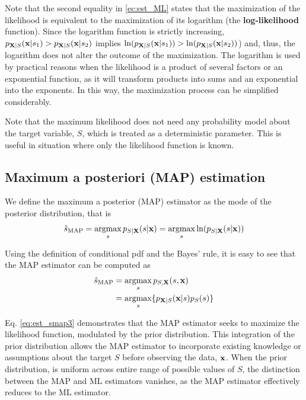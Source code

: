 {Note that the second equality in \eqref{ec:est_ML} states that the maximization of the likelihood is equivalent to the maximization of its logarithm (the \textbf{log-likelihood} function). Since the logarithm function is strictly increasing, $p_{{\bf X}|S}({\bf x}|s_1) > p_{{\bf X}|S}({\bf x}|s_2)$ implies $\ln(p_{{\bf X}|S}({\bf x}|s_1)) > \ln(p_{{\bf X}|S}({\bf x}|s_2))$) and, thus, the logarithm does not alter the outcome of the maximization}. The logarithm is used by practical reasons when the likelihood is a product of several factors or an exponential function, as it will transform products into sums and an exponential into the exponents. In this way, the maximization process can be simplified considerably.

{Note that the maximum likelihood does not need any probability model about the target variable, $S$, which is treated as a deterministic parameter. This is useful in situation where only the likelihood function is known}.


\subsection{Maximum a posteriori (MAP) estimation}

We define the maximum a posterior (MAP) estimator as the mode of the posterior distribution, that is
\begin{equation}
\hat s_{\text{MAP}} = \operatorname*{argmax}_{s} p_{{S|\bf X}}(s|{\bf x})
                    = \operatorname*{argmax}_{s} \ln(p_{{S|\bf X}}(s|{\bf x}))
                   \label{ec:est_MAP}
\end{equation}

{Using the definition of conditional pdf and the Bayes' rule, it is easy to see that the MAP estimator can be computed as
\begin{align}
\label{eq:est_smap2}
\hat s_{\text{MAP}} 
	&= \operatorname*{argmax}_{s} p_{{S,\bf X}}(s,{\bf x})   \\
\label{eq:est_smap3}
    &= \operatorname*{argmax}_{s} \{p_{{\bf X}|S}({\bf x}|s) p_S(s)\}
\end{align}}

{Eq. \eqref{eq:est_smap3} demonstrates that the MAP estimator seeks to maximize the likelihood function, modulated by the prior distribution. This integration of the prior distribution allows the MAP estimator to incorporate existing knowledge or assumptions about the target $S$ before observing the data, ${\bf x}$. When the prior distribution, is uniform across entire range of possible values of $S$, the distinction between the MAP and ML estimators vanishes, as the MAP estimator effectively reduces to the ML estimator.}

